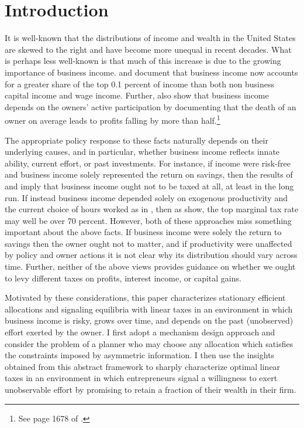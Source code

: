 \documentclass[11pt]{article}
\theoremstyle{plain}
\begin{document}
\newpage

\section{Introduction} \label{intro}


It is well-known that the distributions of income and wealth in the United States are skewed to the right and have become more unequal in recent decades. What is perhaps less well-known is that much of this increase is due to the growing importance of business income. \cite{smith_capitalists_2019} and \cite{cooper_business_2016} document that business income now accounts for a greater share of the top 0.1 percent of income than both non business capital income and wage income. Further, \cite{smith_capitalists_2019} also show that business income depends on the owners' active participation by documenting that the death of an owner on average leads to profits falling by more than half.\footnote{See page 1678 of \cite{smith_capitalists_2019}.}


The appropriate policy response to these facts naturally depends on their underlying causes, and in particular, whether business income reflects innate ability, current effort, or past investments. For instance, if income were risk-free and business income solely represented the return on savings, then the results of \cite{chamley_optimal_1986} and \cite{judd_redistributive_1985} imply that business income ought not to be taxed at all, at least in the long run. If instead business income depended solely on exogenous productivity and the current choice of hours worked as in \cite{mirrlees_exploration_1971}, then as \cite{diamond_case_2011} show, the top marginal tax rate may well be over 70 percent. However, both of these approaches miss something important about the above facts. If business income were solely the return to savings then the owner ought not to matter, and if productivity were unaffected by policy and owner actions it is not clear why its distribution should vary across time. Further, neither of the above views provides guidance on whether we ought to levy different taxes on profits, interest income, or capital gains. 


Motivated by these considerations, this paper characterizes stationary efficient allocations and signaling equilibria with linear taxes in an environment in which business income is risky, grows over time, and depends on the past (unobserved) effort exerted by the owner. I first adopt a mechanism design approach and consider the problem of a planner who may choose any allocation which satisfies the constraints imposed by asymmetric information. I then use the insights obtained from this abstract framework to sharply characterize optimal linear taxes in an environment in which entrepreneurs signal a willingness to exert unobservable effort by promising to retain a fraction of their wealth in their firm. 
\end{document}
